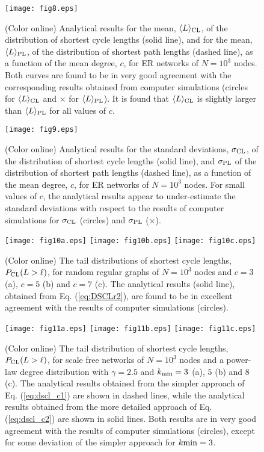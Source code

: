 \documentclass[preprint,pre,superscriptaddress,showpacs]{revtex4}
\begin{document}
\begin{figure}
\texttt{[image: fig8.eps]}
\caption{
(Color online)
Analytical results for the
mean, 
$\langle L \rangle_{\rm CL}$, 
of the distribution of shortest cycle lengths (solid line), 
and for the mean,
$\langle L \rangle_{\rm PL}$,
of the distribution of shortest path lengths (dashed line), 
as a function of the mean degree, $c$, for ER networks 
of $N=10^3$ nodes.
Both curves are found to be in very good agreement with
the corresponding results obtained from computer simulations 
(circles for 
$\langle L \rangle_{\rm CL}$
and $\times$ for
$\langle L \rangle_{\rm PL}$).
It is found that
$\langle L \rangle_{\rm CL}$
is slightly larger than
$\langle L \rangle_{\rm PL}$
for all values of $c$.
}
\label{fig:8}
\end{figure}


\begin{figure}
\texttt{[image: fig9.eps]}
\caption{
(Color online)
Analytical results for the
standard deviations, 
$\sigma_{\rm CL}$, 
of the distribution of shortest cycle lengths (solid line), 
and
$\sigma_{\rm PL}$ 
of the distribution of shortest path lengths (dashed line),
as a function of the mean degree, $c$, for ER networks 
of $N=10^3$ nodes.
For small values of $c$, the analytical results appear to under-estimate
the standard deviations with respect to the results of computer simulations for
$\sigma_{\rm CL}$ (circles)
and
$\sigma_{\rm PL}$ ($\times$).
}
\label{fig:9}
\end{figure}


\begin{figure}
\texttt{[image: fig10a.eps]}
\texttt{[image: fig10b.eps]}
\texttt{[image: fig10c.eps]}
\caption{
(Color online)
The tail distributions of shortest cycle lengths, 
$P_{\rm CL}(L>\ell)$,
for random regular graphs of $N=10^{3}$ nodes and 
$c=3$ (a), $c=5$ (b) and $c=7$ (c).
The analytical results (solid line),
obtained from Eq. (\ref{eq:DSCLr2}),
are found to be in excellent agreement with the results of 
computer simulations (circles).
}
\label{fig:10}
\end{figure}


\begin{figure}
\texttt{[image: fig11a.eps]}
\texttt{[image: fig11b.eps]}
\texttt{[image: fig11c.eps]}
\caption{
(Color online)
The tail distribution of shortest cycle lengths, 
$P_{\rm CL}(L>\ell)$,
for scale free networks of $N=10^{3}$ nodes and a 
power-law degree distribution with
$\gamma=2.5$ and $k_{\rm min}=3$ (a), $5$ (b) and $8$ (c).
The analytical results 
obtained from the
simpler approach of
Eq. (\ref{eq:dscl_c1}) 
are shown in dashed lines,
while the analytical results obtained from 
the more detailed approach of
Eq. (\ref{eq:dscl_c2}) 
are shown in solid lines.
Both results are in very good agreement
with the results of computer simulations (circles), 
except for some deviation of the simpler approach 
for $k{\rm min}=3$.
}
\label{fig:11}
\end{figure}
\end{document}
